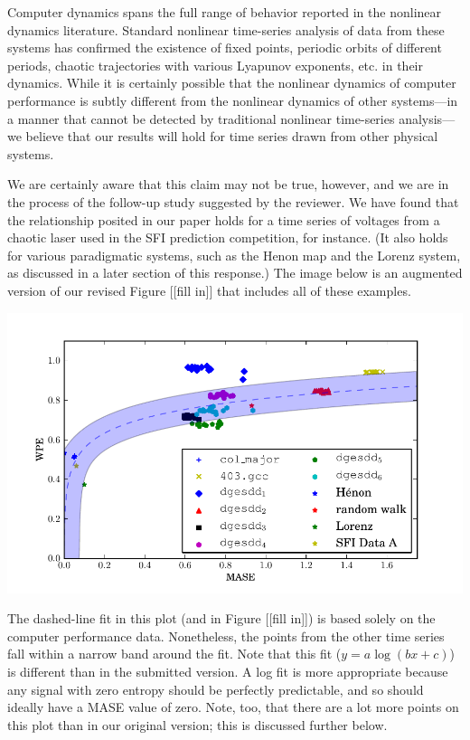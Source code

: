 \documentclass[12pt]{article}
\newcommand{\alert}[1]{{\color{red}#1}}
\begin{document}
Computer dynamics spans the full range of behavior reported in the
nonlinear dynamics literature.  Standard nonlinear time-series
analysis of data from these systems has confirmed the existence of
fixed points, periodic orbits of different periods, chaotic
trajectories with various Lyapunov exponents, etc.  in their dynamics.
While it is certainly possible that the nonlinear dynamics of computer
performance is subtly different from the nonlinear dynamics of other
systems---in a manner that cannot be detected by traditional nonlinear
time-series analysis---we believe that our results will hold for time
series drawn from other physical systems.  

We are certainly aware that this claim may not be true, however, and
we are in the process of the follow-up study suggested by the
reviewer.  We have found that the relationship posited in our paper
holds for a time series of voltages from a chaotic laser used in the
SFI prediction competition, for instance.  (It also holds for various
paradigmatic systems, such as the Henon map and the Lorenz system, as
discussed in a later section of this response.)  The image below is an
augmented version of our revised Figure \alert{[[fill in]]} that
includes all of these examples.

\begin{center}
    \includegraphics[width=0.8\columnwidth]{figs/new_prediction_vs_entropy_extra_autolog}
\end{center}

\noindent The dashed-line fit in this plot (and in Figure
\alert{[[fill in]])} is based solely on the computer performance data.
Nonetheless, the points from the other time series fall within a
narrow band around the fit.  Note that this fit ($y = a \log(b x +
c)$) is different than in the submitted version.  A log fit is more
appropriate because any signal with zero entropy should be perfectly
predictable, and so should ideally have a MASE value of zero.  Note,
too, that there are a lot more points on this plot than in our
original version; this is discussed further below.
\end{document}
